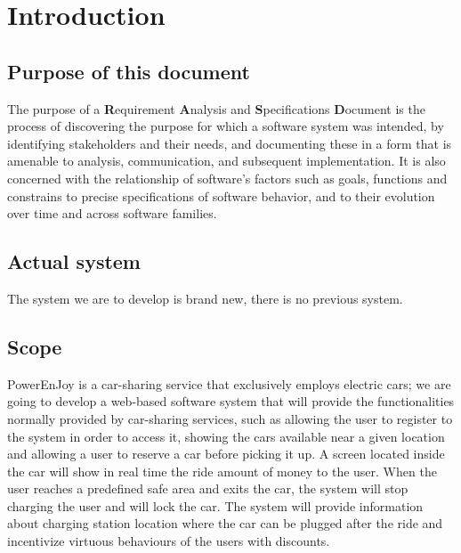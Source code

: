 \section{Introduction}
\subsection{Purpose of this document}
The purpose of a \textbf{R}equirement \textbf{A}nalysis and \textbf{S}pecifications \textbf{D}ocument is the process of discovering the purpose for which a software system was intended, by identifying stakeholders and their needs, and documenting these in a form that is amenable to analysis, communication, and subsequent implementation. \cite{RE} It is also concerned with the relationship of software's factors such as goals, functions and constrains to precise specifications of software behavior, and to their evolution over time and across software families.\cite{Zave}

\subsection{Actual system}
The system we are to develop is brand new, there is no previous system.

\subsection{Scope}
PowerEnJoy is a car-sharing service that exclusively employs electric cars; we are going to develop a web-based software system that will provide the functionalities normally provided by car-sharing services, such as allowing the user to register to the system in order to access it, showing the cars available near a given location and allowing a user to reserve a car before picking it up.
A screen located inside the car will show in real time the ride amount of money to the user. When the user reaches a predefined safe area and exits the car, the system will stop charging the user and will lock the car. The system will provide information about charging station location where the car can be plugged after the ride and incentivize virtuous behaviours of the users with discounts.\cite{Assignments}
